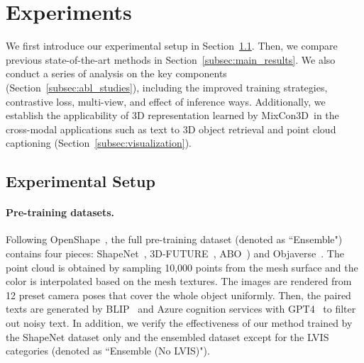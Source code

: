 \documentclass{article} \usepackage{iclr2024_conference,times}
\newcommand{\ourmethod}{MixCon3D}
\begin{document}
\section{Experiments}
\label{sec:experiments} 
We first introduce our experimental setup in Section~\ref{sec:exp_setup}.
Then, we compare previous state-of-the-art methods in Section~\ref{subsec:main_results}.
We also conduct a series of analysis on the key components (Section~\ref{subsec:abl_studies}), including the improved training strategies, contrastive loss, multi-view, and effect of inference ways.
Additionally, we establish the applicability of 3D representation learned by \ourmethod~in the cross-modal applications such as text to 3D object retrieval and point cloud captioning (Section~\ref{subsec:visualization}).

\subsection{Experimental Setup}
\label{sec:exp_setup}
\paragraph{Pre-training datasets.}
Following OpenShape~\citep{openshape}, the full pre-training dataset (denoted as ``Ensemble") contains four pieces: ShapeNet~\citep{shapenet}, 3D-FUTURE~\citep{3d-future}, ABO~\citep{abo}) and Objaverse~\citep{objaverse}. 
The point cloud is obtained by sampling 10,000 points from the mesh surface and the color is interpolated based on the mesh textures. 
The images are rendered from 12 preset camera poses that cover the whole object uniformly.
Then, the paired texts are generated by BLIP~\citep{blip, blipv2} and Azure cognition services with GPT4~\citep{GPT4} to filter out noisy text. 
In addition, we verify the effectiveness of our method trained by the ShapeNet dataset only and the ensembled dataset except for the LVIS~\citep{lvis} categories (denoted as ``Ensemble (No LVIS)").
\end{document}
